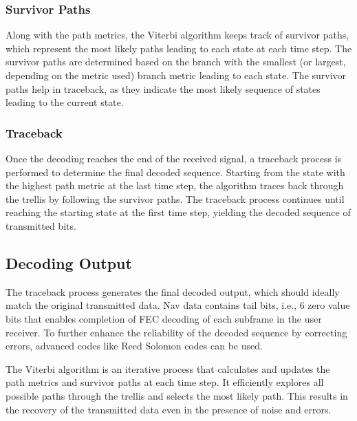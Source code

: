 \subsubsection{Survivor Paths}
Along with the path metrics, the Viterbi algorithm keeps track of survivor paths, which represent the most likely paths leading to each state at each time step.
The survivor paths are determined based on the branch with the smallest (or largest, depending on the metric used) branch metric leading to each state.
The survivor paths help in traceback, as they indicate the most likely sequence of states leading to the current state.

\subsubsection{Traceback}
Once the decoding reaches the end of the received signal, a traceback process is performed to determine the final decoded sequence.
Starting from the state with the highest path metric at the last time step, the algorithm traces back through the trellis by following the survivor paths.
The traceback process continues until reaching the starting state at the first time step, yielding the decoded sequence of transmitted bits.

\subsection{Decoding Output}
The traceback process generates the final decoded output, which should ideally match the original transmitted data. Nav data contains tail bits, i.e., 6 zero value bits that enables completion of FEC decoding of each subframe in the user receiver.
To further enhance the reliability of the decoded sequence by correcting errors, advanced codes like Reed Solomon codes can be used.

\noindent The Viterbi algorithm is an iterative process that calculates and updates the path metrics and survivor paths at each time step. It efficiently explores all possible paths through the trellis and selects the most likely path. This results in the recovery of the transmitted data even in the presence of noise and errors.

